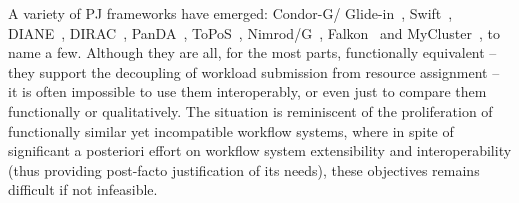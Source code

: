 \documentclass[conference]{IEEEtran}
\begin{document}
A variety of PJ frameworks have emerged: Condor-G/
Glide-in~\cite{condor-g}, Swift~\cite{Wilde2011},
DIANE~\cite{Moscicki:908910}, DIRAC~\cite{1742-6596-219-6-062049},
PanDA~\cite{1742-6596-219-6-062041}, ToPoS~\cite{topos},
Nimrod/G~\cite{10.1109/HPC.2000.846563}, Falkon~\cite{1362680} and
MyCluster~\cite{1652061}, to name a few. Although they are all, for the
most parts, functionally equivalent -- they support the decoupling of
workload submission from resource assignment -- it is often impossible
to use them interoperably, or even just to compare them functionally
or qualitatively.  The situation is reminiscent of the proliferation
of functionally similar yet incompatible workflow systems, where in
spite of significant a posteriori effort on workflow system
extensibility and interoperability (thus providing post-facto
justification of its needs), these objectives remains difficult if not
infeasible.









\end{document}
